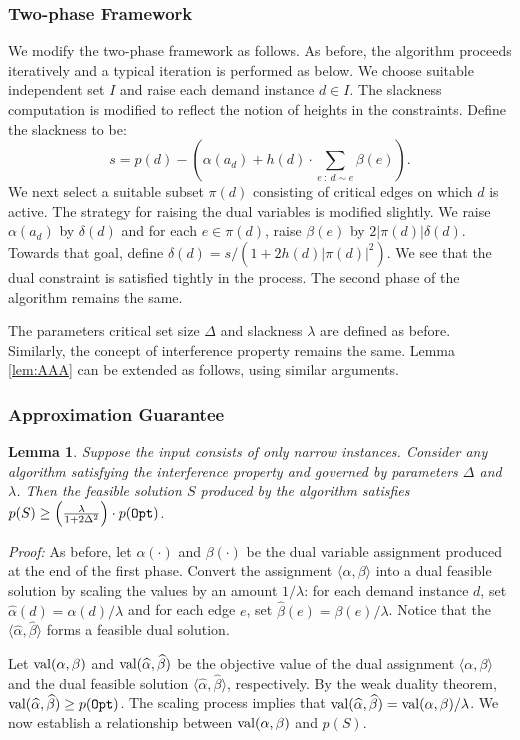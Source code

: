 \documentclass[11pt]{article}
\newtheorem{lemma}[theorem]{\bf Lemma}
\newcommand{\proof} {{\it Proof: }}
\newcommand{\wh}[1] {\widehat{#1}}
\newcommand{\Opt} {{\tt Opt}}
\newcommand{\val} {{\rm val}}
\begin{document}
\subsubsection*{Two-phase Framework}
We modify the two-phase framework as follows.
As before, the algorithm proceeds iteratively and a typical iteration is performed as below. 
We choose suitable independent set $I$ and raise each demand instance $d\in I$.
The slackness computation is modified to reflect the notion of heights in the constraints.
Define the slackness to be:
\[
s = p(d) - \left( \alpha(a_d) + h(d)\cdot \sum_{e~:~d\sim e} \beta(e) \right).
\]
We next select a suitable subset $\pi(d)$ consisting of critical edges on which $d$ is active.
The strategy for raising the dual variables is modified slightly.
We raise $\alpha(a_d)$ by $\delta(d)$ and for each $e\in \pi(d)$, 
raise $\beta(e)$ by $2|\pi(d)|\delta(d)$. Towards that goal, define $\delta(d)=s/(1+2h(d)|\pi(d)|^2)$.
We see that the dual constraint is satisfied tightly in the process.
The second phase of the algorithm remains the same.

The parameters critical set size $\Delta$ and slackness $\lambda$ are defined as before.
Similarly, the concept of interference property remains the same.
Lemma \ref{lem:AAA} can be extended as follows, using similar arguments.

\subsubsection*{Approximation Guarantee}
\begin{lemma}
\label{lem:JJJ}
Suppose the input consists of only narrow instances.
Consider any algorithm satisfying the interference property and governed by parameters $\Delta$ and $\lambda$.
Then the feasible solution $S$ produced by the algorithm satisfies 
$p(S)\geq \left(\frac{\lambda}{1+2\Delta^2}\right)\cdot p(\Opt)$.
\end{lemma}
\proof
As before, let $\alpha(\cdot)$ and $\beta(\cdot)$ be the dual variable assignment produced at the end of the first phase.
Convert the assignment $\langle \alpha, \beta\rangle$ into a dual feasible solution
by scaling the values by an amount $1/\lambda$:
for each demand instance $d$, set $\wh{\alpha}(d) = \alpha(d)/\lambda$ and 
for each edge $e$, set $\wh{\beta}(e)=\beta(e)/\lambda$.
Notice that the $\langle \wh{\alpha},\wh{\beta}\rangle$ forms a feasible dual solution.

Let $\val(\alpha, \beta)$ and $\val(\wh{\alpha},\wh{\beta})$ be the objective
value of the dual assignment $\langle \alpha, \beta \rangle$
and the dual feasible solution $\langle \wh{\alpha},\wh{\beta}\rangle$,
respectively. By the weak duality theorem, $\val(\wh{\alpha},\wh{\beta}) \geq p(\Opt)$.
The scaling process implies that $\val(\wh{\alpha},\wh{\beta}) = \val(\alpha,\beta)/\lambda$.
We now establish a relationship between $\val(\alpha,\beta)$ and $p(S)$.
\end{document}
